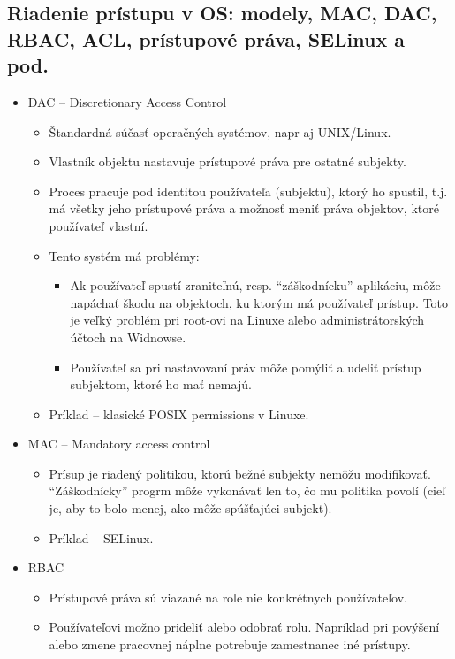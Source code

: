 \documentclass[12pt,a4paper]{article}
\begin{document}
{    \subsection{Riadenie prístupu v OS: modely, MAC, DAC, RBAC, ACL, prístupové práva, SELinux a pod.}
    \begin{itemize}
        \item DAC -- Discretionary Access Control
        \begin{itemize}
            \item Štandardná súčasť operačných systémov, napr aj UNIX/Linux.
            \item Vlastník objektu nastavuje prístupové práva pre ostatné subjekty.
            \item Proces pracuje pod identitou používateľa (subjektu), ktorý ho spustil, t.j. má všetky jeho prístupové práva a možnosť meniť práva objektov, ktoré používateľ vlastní.
            \item Tento systém má problémy:
            \begin{itemize}
                \item Ak používateľ spustí zraniteľnú, resp. ``záškodnícku'' aplikáciu, môže napáchať škodu na objektoch, ku ktorým má používateľ prístup. Toto je veľký problém pri root-ovi na Linuxe alebo administrátorských účtoch na Widnowse.
                \item Používateľ sa pri nastavovaní práv môže pomýliť a udeliť prístup subjektom, ktoré ho mať nemajú.
            \end{itemize}
            \item Príklad -- klasické POSIX permissions v Linuxe.
        \end{itemize}
        \item MAC -- Mandatory access control
        \begin{itemize}
            \item Prísup je riadený politikou, ktorú bežné subjekty nemôžu modifikovať. ``Záškodnícky'' progrm môže vykonávať len to, čo mu politika povolí (cieľ je, aby to bolo menej, ako môže spúšťajúci subjekt).
            \item Príklad -- SELinux.
        \end{itemize}
        \item RBAC
        \begin{itemize}
            \item Prístupové práva sú viazané na role nie konkrétnych používateľov.
            \item Používateľovi možno prideliť alebo odobrať rolu. Napríklad pri povýšení alebo zmene pracovnej náplne potrebuje zamestnanec iné prístupy.

\end{itemize}
\end{itemize}}
\end{document}
